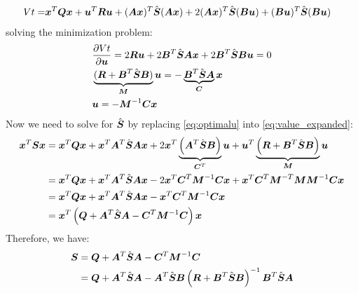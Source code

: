 \documentclass{article}
\begin{document}
\begin{itemize}
    \begin{align*}
       Vt =& \vxt^T \vQt \vxt + \vut^T \vRt \vut
             + (\vAt \vxt)^T \vSp (\vAt \vxt)
             + 2 (\vAt \vxt)^T \vSp (\vBt \vut)
             + (\vBt \vut)^T \vSp (\vBt \vut)
    \end{align*}
    solving the minimization problem:
    \begin{align}
      & \dfrac{\partial Vt}{\partial \vut} =
          2 \vRt \vut + 2 \vBt^T \vSp \vAt \vxt + 2 \vBt^T \vSp \vBt \vut = 0 \nonumber \\
      & \underbrace{(\vRt + \vBt^T \vSp \vBt)}_{\vM}\vut =
                        - \underbrace{\vBt^T \vSp \vAt}_{\vC} \vxt  \nonumber \\
      & \vut = - \vM^{-1} \vC \vxt   \label{eq:optimalu}
    \end{align}
    Now we need to solve for $\vSp$ by replacing \ref{eq:optimalu} into
      \ref{eq:value_expanded}:
    \begin{align*}
      \vxt^T \vSt \vxt & =
            \vxt^T \vQt \vxt
          + \vxt^T \vAt^T \vSp \vAt \vxt
          + 2 \vxt^T \underbrace{\group{\vAt^T \vSp \vBt}}_{\vC^T} \vut
          + \vut^T \underbrace{\group{\vRt + \vBt^T \vSp \vBt}}_{\vM} \vut \\
        & =
            \vxt^T \vQt \vxt
          + \vxt^T \vAt^T \vSp \vAt \vxt
          - 2 \vxt^T \vC^T \vM^{-1} \vC \vxt
          + \vxt^T \vC^T \vM^{-T} \vM \vM^{-1} \vC \vxt \\
        & =
            \vxt^T \vQt \vxt
          + \vxt^T \vAt^T \vSp \vAt \vxt
          - \vxt^T \vC^T \vM^{-1} \vC \vxt \\
        & =
            \vxt^T \group{\vQt
                          + \vAt^T \vSp \vAt
                          - \vC^T \vM^{-1} \vC} \vxt
    \end{align*}
    Therefore, we have:
    \begin{align*}
      \vSt & = \vQt + \vAt^T \vSp \vAt
                    - \vC^T \vM^{-1} \vC \\
           & = \vQt + \vAt^T \vSp \vAt
                    - \vAt^T \vSp \vBt \group{\vRt + \vBt^T \vSp \vBt}^{-1} \vBt^T \vSp \vAt 
    \end{align*}

\end{itemize}
\end{document}
